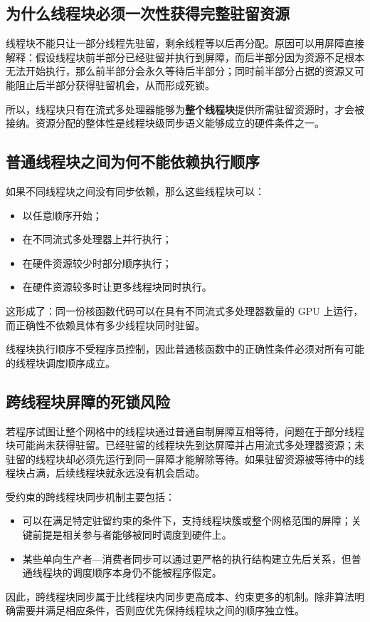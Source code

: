 \subsection{为什么线程块必须一次性获得完整驻留资源}

线程块不能只让一部分线程先驻留，剩余线程等以后再分配。原因可以用屏障直接解释：假设线程块前半部分已经驻留并执行到屏障，而后半部分因为资源不足根本无法开始执行，那么前半部分会永久等待后半部分；同时前半部分占据的资源又可能阻止后半部分获得驻留机会，从而形成死锁。

所以，线程块只有在流式多处理器能够为\textbf{整个线程块}提供所需驻留资源时，才会被接纳。资源分配的整体性是线程块级同步语义能够成立的硬件条件之一。

\subsection{普通线程块之间为何不能依赖执行顺序}

如果不同线程块之间没有同步依赖，那么这些线程块可以：

\begin{itemize}
  \item 以任意顺序开始；
  \item 在不同流式多处理器上并行执行；
  \item 在硬件资源较少时部分顺序执行；
  \item 在硬件资源较多时让更多线程块同时执行。
\end{itemize}

这形成了：同一份核函数代码可以在具有不同流式多处理器数量的 GPU 上运行，而正确性不依赖具体有多少线程块同时驻留。

\begin{keybox}
线程块执行顺序不受程序员控制，因此普通核函数中的正确性条件必须对所有可能的线程块调度顺序成立。
\end{keybox}

\subsection{跨线程块屏障的死锁风险}

若程序试图让整个网格中的线程块通过普通自制屏障互相等待，问题在于部分线程块可能尚未获得驻留。已经驻留的线程块先到达屏障并占用流式多处理器资源；未驻留的线程块却必须先运行到同一屏障才能解除等待。如果驻留资源被等待中的线程块占满，后续线程块就永远没有机会启动。

受约束的跨线程块同步机制主要包括：

\begin{itemize}
  \item {}可以在满足特定驻留约束的条件下，支持线程块簇或整个网格范围的屏障；关键前提是相关参与者能够被同时调度到硬件上。
  \item 某些单向生产者—消费者同步可以通过更严格的执行结构建立先后关系，但普通线程块的调度顺序本身仍不能被程序假定。
\end{itemize}

因此，跨线程块同步属于比线程块内同步更高成本、约束更多的机制。除非算法明确需要并满足相应条件，否则应优先保持线程块之间的顺序独立性。
